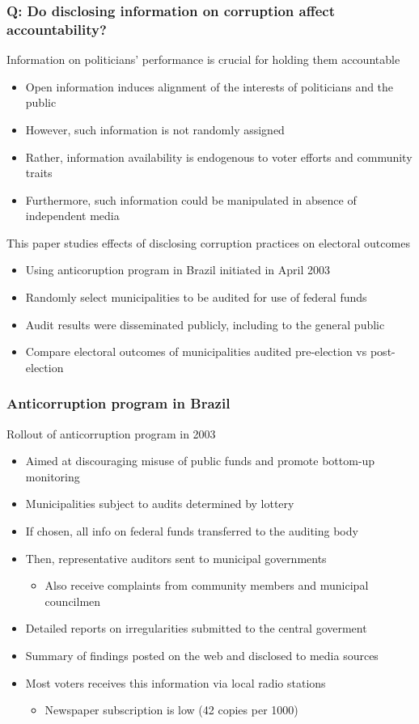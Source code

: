 \documentclass[aspectratio=169]{beamer}
\begin{document}
\begin{frame}
\frametitle{Q: Do disclosing information on corruption affect accountability?} 
Information on politicians' performance is crucial for holding them accountable
\begin{itemize}\setlength\itemsep{3pt}
\item Open information induces alignment of the interests of politicians and the public
\item However, such information is not randomly assigned
\item Rather, information availability is endogenous to voter efforts and community traits
\item Furthermore, such information could be manipulated in absence of independent media
\end{itemize}\medskip
This paper studies effects of disclosing corruption practices on electoral outcomes
\begin{itemize}\setlength\itemsep{3pt}
  \item Using anticoruption program in Brazil initiated in April 2003
  \item Randomly select municipalities to be audited for use of federal funds
  \item Audit results were disseminated publicly, including to the general public
  \item Compare electoral outcomes of municipalities audited pre-election vs post-election
\end{itemize}
\end{frame}



\begin{frame}
\frametitle{Anticorruption program in Brazil} 
Rollout of anticorruption program in 2003
\begin{itemize}\setlength\itemsep{3pt}
\item Aimed at discouraging misuse of public funds and promote bottom-up monitoring
\item Municipalities subject to audits determined by lottery
\item If chosen, all info on federal funds transferred to the auditing body
\item Then, representative auditors sent to municipal governments
\begin{itemize}\setlength\itemsep{3pt}
\item Also receive complaints from community members and municipal councilmen
\end{itemize}
\item Detailed reports on irregularities submitted to the central goverment
\item Summary of findings posted on the web and disclosed to media sources
\item Most voters receives this information via local radio stations
\begin{itemize}\setlength\itemsep{3pt}
\item Newspaper subscription is low (42 copies per 1000)
\end{itemize}
\end{itemize}\medskip
\end{frame}
\end{document}
